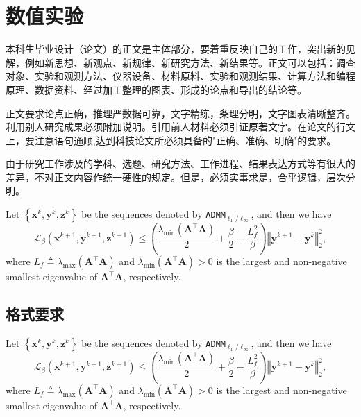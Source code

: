 	{\centering\chapter{数值实验}}
	
	本科生毕业设计（论文）的正文是主体部分，要着重反映自己的工作，突出新的见解，例如新思想、新观点、新规律、新研究方法、新结果等。正文可以包括：调查对象、实验和观测方法、仪器设备、材料原料、实验和观测结果、计算方法和编程原理、数据资料、经过加工整理的图表、形成的论点和导出的结论等。
	
	正文要求论点正确，推理严数据可靠，文字精练，条理分明，文字图表清晰整齐。利用别人研究成果必须附加说明。引用前人材料必须引证原著文字。在论文的行文上，要注意语句通顺,达到科技论文所必须具备的"正确、准确、明确"的要求。
	
	由于研究工作涉及的学科、选题、研究方法、工作进程、结果表达方式等有很大的差异，不对正文内容作统一硬性的规定。但是，必须实事求是，合乎逻辑，层次分明。

\begin{lemma}\label{LemmaLbeta}
	Let $\left\{ \mathbf{x}^{k}, \mathbf{y}^{k}, \mathbf{z}^{k} \right\}$ be the sequences denoted by {\tt ADMM}$_{\ell_{1}/\ell_{\infty}}$, and then we have 
	\begin{equation} 
			\mathcal{L}_{\beta} \left( \mathbf{x}^{k+1}, \mathbf{y}^{k+1}, \mathbf{z}^{k+1} \right) \leq  \left(\frac{\lambda_{\min}  \left( \mathbf{A}^{\top} \mathbf{A} \right)}{2}  +  \frac{\beta}{2} - \frac{L_f^2}{\beta} \right) \left \Vert \mathbf{y}^{k+1} - \mathbf{y}^{k} \right \Vert_{2}^{2},
	\end{equation} 
	where $L_f \triangleq \lambda_{\max} \left( \mathbf{A}^{\top} \mathbf{A} \right)$ and  $\lambda_{\min}  \left( \mathbf{A}^{\top} \mathbf{A} \right) > 0$  is the largest and non-negative smallest eigenvalue of $ \mathbf{A}^{\top} \mathbf{A}$, respectively.
\end{lemma}
	
	\section{格式要求}
	 
\begin{proposition}\label{LemmaLbeta1}
	Let $\left\{ \mathbf{x}^{k}, \mathbf{y}^{k}, \mathbf{z}^{k} \right\}$ be the sequences denoted by {\tt ADMM}$_{\ell_{1}/\ell_{\infty}}$, and then we have 
	\begin{equation} 
			\mathcal{L}_{\beta} \left( \mathbf{x}^{k+1}, \mathbf{y}^{k+1}, \mathbf{z}^{k+1} \right) \leq  \left(\frac{\lambda_{\min}  \left( \mathbf{A}^{\top} \mathbf{A} \right)}{2}  +  \frac{\beta}{2} - \frac{L_f^2}{\beta} \right) \left \Vert \mathbf{y}^{k+1} - \mathbf{y}^{k} \right \Vert_{2}^{2},
	\end{equation} 
	where $L_f \triangleq \lambda_{\max} \left( \mathbf{A}^{\top} \mathbf{A} \right)$ and  $\lambda_{\min}  \left( \mathbf{A}^{\top} \mathbf{A} \right) > 0$  is the largest and non-negative smallest eigenvalue of $ \mathbf{A}^{\top} \mathbf{A}$, respectively.
\end{proposition}


